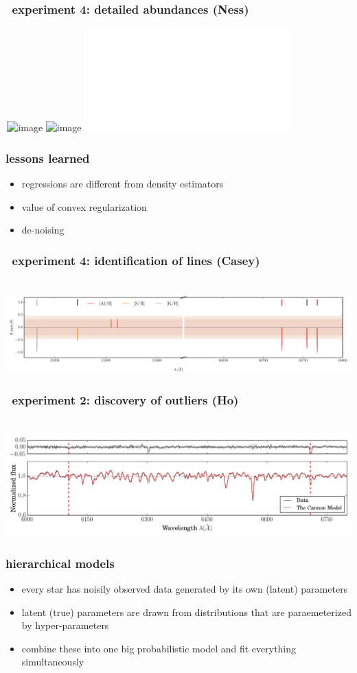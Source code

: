 \documentclass[pdftex]{beamer}
\begin{document}
\begin{frame}
  \frametitle{\tc\ experiment 4: detailed abundances (Ness)}
  \,\hfill\includegraphics<1>[height=\figureheight]{../documents/abundances/20elem7_tc2_nofilt.png}%
          \includegraphics<2>[height=\figureheight]{../documents/abundances/20elem12_tc2_nofilt.png}%
          \includegraphics<3>[trim=0.5in 2in 0.5in 1.9in, width=\figurewidth]{sn.pdf}%
\end{frame}

\begin{frame}
  \frametitle{lessons learned}
  \begin{itemize}
  \item regressions are different from density estimators
  \item value of convex regularization
  \item de-noising
  \end{itemize}
\end{frame}

\begin{frame}
  \frametitle{\tc\ experiment 4: identification of lines (Casey)}
  \,\hfill\includegraphics[width=\figurewidth]{sparse-first-order-coefficients.pdf}%
\end{frame}

\begin{frame}
  \frametitle{\tc\ experiment 2: discovery of outliers (Ho)}
  \,\hfill\includegraphics[width=\figurewidth]{resid_376.png}%
\end{frame}

\begin{frame}
  \frametitle{hierarchical models}
  \begin{itemize}
  \item every star has noisily observed data generated by its own (latent) parameters
  \item latent (true) parameters are drawn from distributions that are
    paraemeterized by hyper-parameters
  \item combine these into one big probabilistic model and fit everything simultaneously
  \end{itemize}
\end{frame}
\end{document}
